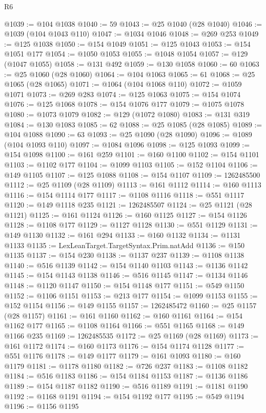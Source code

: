 \begin{lexlean}{R6}
\begin{coremodule}
@1039 := @104 @1038
@1040 := 59
@1043 := @25 @1040 (@28 @1040)
@1046 := @1039 (@104 @1043 @110)
@1047 := @1034 @1046
@1048 := @269 @253
@1049 := @125 @1038
@1050 := @154 @1049
@1051 := @125 @1043
@1053 := @154 @1051 @177
@1054 := @1050 @1053
@1055 := @1048 @1054
@1057 := @129 (@1047 @1055)
@1058 := @131 @492
@1059 := @130 @1058
@1060 := 60
@1063 := @25 @1060 (@28 @1060)
@1064 := @104 @1063
@1065 := 61
@1068 := @25 @1065 (@28 @1065)
@1071 := @1064 (@104 @1068 @110)
@1072 := @1059 @1071
@1073 := @269 @283
@1074 := @125 @1063
@1075 := @154 @1074
@1076 := @125 @1068
@1078 := @154 @1076 @177
@1079 := @1075 @1078
@1080 := @1073 @1079
@1082 := @129 (@1072 @1080)
@1083 := @131 @319
@1084 := @130 @1083
@1085 := 62
@1088 := @25 @1085 (@28 @1085)
@1089 := @104 @1088
@1090 := 63
@1093 := @25 @1090 (@28 @1090)
@1096 := @1089 (@104 @1093 @110)
@1097 := @1084 @1096
@1098 := @125 @1093
@1099 := @154 @1098
@1100 := @161 @259
@1101 := @160 @1100
@1102 := @154 @1101
@1103 := @1102 @177
@1104 := @1099 @1103
@1105 := @152 @1104
@1106 := @149 @1105
@1107 := @125 @1088
@1108 := @154 @1107
@1109 := 1262485500
@1112 := @25 @1109 (@28 @1109)
@1113 := @161 @1112
@1114 := @160 @1113
@1116 := @154 @1114 @177
@1117 := @1108 @1116
@1118 := @551 @1117
@1120 := @149 @1118 @235
@1121 := 1262485507
@1124 := @25 @1121 (@28 @1121)
@1125 := @161 @1124
@1126 := @160 @1125
@1127 := @154 @1126
@1128 := @1108 @177
@1129 := @1127 @1128
@1130 := @551 @1129
@1131 := @149 @1130
@1132 := @161 @294
@1133 := @160 @1132
@1134 := @1131 @1133
@1135 := LexLeanTarget.TargetSyntax.Prim.natAdd
@1136 := @150 @1135
@1137 := @154 @230
@1138 := @1137 @237
@1139 := @1108 @1138
@1140 := @516 @1139
@1142 := @154 @1140 @1103
@1143 := @1136 @1142
@1145 := @154 @1143 @1138
@1146 := @516 @1145
@1147 := @1134 @1146
@1148 := @1120 @1147
@1150 := @154 @1148 @177
@1151 := @549 @1150
@1152 := @1106 @1151
@1153 := @213 @177
@1154 := @1099 @1153
@1155 := @152 @1154
@1156 := @149 @1155
@1157 := 1262485472
@1160 := @25 @1157 (@28 @1157)
@1161 := @161 @1160
@1162 := @160 @1161
@1164 := @154 @1162 @177
@1165 := @1108 @1164
@1166 := @551 @1165
@1168 := @149 @1166 @235
@1169 := 1262485535
@1172 := @25 @1169 (@28 @1169)
@1173 := @161 @1172
@1174 := @160 @1173
@1176 := @154 @1174 @1128
@1177 := @551 @1176
@1178 := @149 @1177
@1179 := @161 @1093
@1180 := @160 @1179
@1181 := @1178 @1180
@1182 := @726 @237
@1183 := @1108 @1182
@1184 := @516 @1183
@1186 := @154 @1184 @1153
@1187 := @1136 @1186
@1189 := @154 @1187 @1182
@1190 := @516 @1189
@1191 := @1181 @1190
@1192 := @1168 @1191
@1194 := @154 @1192 @177
@1195 := @549 @1194
@1196 := @1156 @1195

\end{coremodule}
\end{lexlean}
